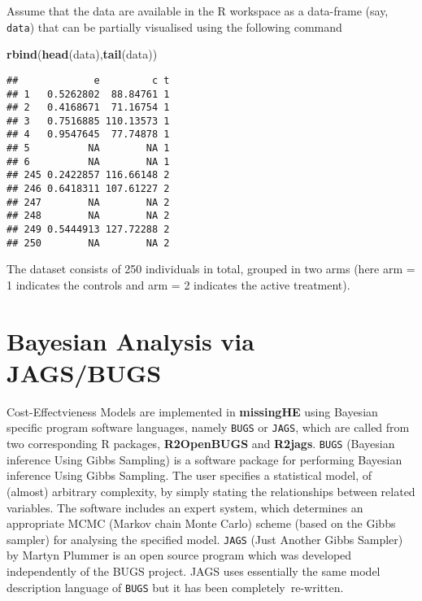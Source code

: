 \documentclass[]{article}
\newenvironment{Shaded}{\begin{snugshade}}{\end{snugshade}}
\newcommand{\KeywordTok}[1]{\textcolor[rgb]{0.13,0.29,0.53}{\textbf{{#1}}}}
\newcommand{\NormalTok}[1]{{#1}}
\begin{document}
Assume that the data are available in the R workspace as a data-frame
(say, \texttt{data}) that can be partially visualised using the
following command

\begin{Shaded}
\begin{Highlighting}[]
\KeywordTok{rbind}\NormalTok{(}\KeywordTok{head}\NormalTok{(data),}\KeywordTok{tail}\NormalTok{(data))}
\end{Highlighting}
\end{Shaded}

\begin{verbatim}
##             e         c t
## 1   0.5262802  88.84761 1
## 2   0.4168671  71.16754 1
## 3   0.7516885 110.13573 1
## 4   0.9547645  77.74878 1
## 5          NA        NA 1
## 6          NA        NA 1
## 245 0.2422857 116.66148 2
## 246 0.6418311 107.61227 2
## 247        NA        NA 2
## 248        NA        NA 2
## 249 0.5444913 127.72288 2
## 250        NA        NA 2
\end{verbatim}

The dataset consists of 250 individuals in total, grouped in two arms
(here arm = 1 indicates the controls and arm = 2 indicates the active
treatment).

\section{\texorpdfstring{Bayesian Analysis via
JAGS/BUGS\label{Bayes}}{Bayesian Analysis via JAGS/BUGS}}\label{bayesian-analysis-via-jagsbugs}

Cost-Effectvieness Models are implemented in \textbf{missingHE} using
Bayesian specific program software languages, namely \texttt{BUGS} or
\texttt{JAGS}, which are called from two corresponding R packages,
\textbf{R2OpenBUGS} and \textbf{R2jags}. \texttt{BUGS} (Bayesian
inference Using Gibbs Sampling) \citep{Lunn} is a software package for
performing Bayesian inference Using Gibbs Sampling. The user specifies a
statistical model, of (almost) arbitrary complexity, by simply stating
the relationships between related variables. The software includes an
expert system, which determines an appropriate MCMC \citep{Brooks}
(Markov chain Monte Carlo) scheme (based on the Gibbs sampler) for
analysing the specified model. \texttt{JAGS} \citep{Plummer} (Just
Another Gibbs Sampler) by Martyn Plummer is an open source program which
was developed independently of the BUGS project. JAGS uses essentially
the same model description language of \texttt{BUGS} but it has been
completely~re-written.
\end{document}
